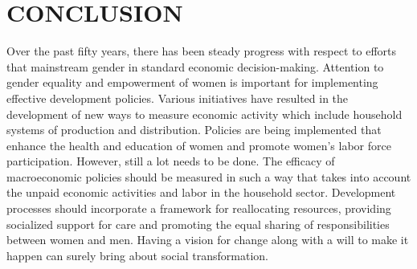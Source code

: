 \documentclass[12pt]{article}
\begin{document}
\section{ CONCLUSION}
Over the past fifty years, there has been steady progress with respect to efforts that
mainstream gender in standard economic decision-making. Attention to gender equality and
empowerment of women is important for implementing effective development policies.
Various initiatives have resulted in the development
of new ways to measure economic activity which include household systems of production
and distribution. Policies are being implemented that enhance the health and education of
women and promote women’s labor force participation. However, still a lot needs to be done.
The efficacy of macroeconomic policies should be measured in such a way that takes into
account the unpaid economic activities and labor in the household sector. Development
processes should incorporate a framework for reallocating resources, providing socialized
support for care and promoting the equal sharing of responsibilities between women and men.
Having a vision for change along with a will to make it happen can surely bring about social
transformation.

\end{document}
